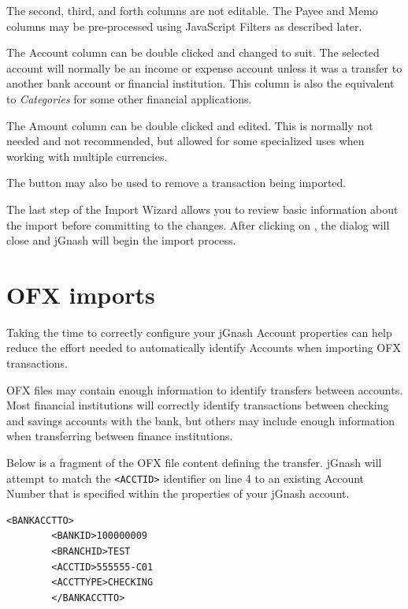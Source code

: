 \documentclass[letterpaper,12pt]{book}
\begin{document}
    The second, third, and forth columns are not editable. The Payee and Memo
    columns may be pre-processed using JavaScript Filters as described later.

    The Account column can be double clicked and changed to suit. The selected
    account will normally be an income or expense account unless it was a transfer
    to another bank account or financial institution. This column is also the
    equivalent to \textit{Categories} for some other financial applications.

    The Amount column can be double clicked and edited. This is normally not
    needed and not recommended, but allowed for some specialized uses when working
    with multiple currencies.

    The  button may also be used to remove a transaction being imported.


    The last step of the Import Wizard allows you to review basic information about
    the import before committing to the changes. After clicking on ,
    the dialog will close and jGnash will begin the import process.

    \section{OFX imports}
    Taking the time to correctly configure your jGnash Account properties can help
    reduce the effort needed to automatically identify Accounts when importing OFX
    transactions.

    OFX files may contain enough information to identify transfers between accounts.
    Most financial institutions will correctly identify transactions between checking
    and savings accounts with the bank, but others may include enough information
    when transferring between finance institutions.

    Below is a fragment of the OFX file content defining the transfer. jGnash will
    attempt to match the \texttt{<ACCTID>} identifier on line 4 to an existing Account Number
    that is specified within the properties of your jGnash account.
    \\ %
    \begin{lstlisting}[caption={OFX File Fragment}]
        <BANKACCTTO>
        <BANKID>100000009
        <BRANCHID>TEST
        <ACCTID>555555-C01
        <ACCTTYPE>CHECKING
        </BANKACCTTO>
    \end{lstlisting}
\end{document}
